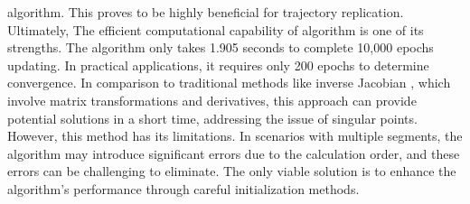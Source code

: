 algorithm. This proves to be highly beneficial for trajectory replication. \\
Ultimately, The efficient computational capability of algorithm is one of its strengths. The algorithm only 
takes 1.905 seconds to complete 10,000 epochs updating. In practical applications, it requires only 200 epochs 
to determine convergence. In comparison to traditional methods like inverse Jacobian \cite{inverse_jacobian}, 
which involve matrix transformations and derivatives, this approach can provide potential solutions in a short 
time, addressing the issue of singular points. However, this method has its limitations. In scenarios with 
multiple segments, the algorithm may introduce significant errors due to the calculation order, and these errors 
can be challenging to eliminate. The only viable solution is to enhance the algorithm's performance through 
careful initialization methods.
